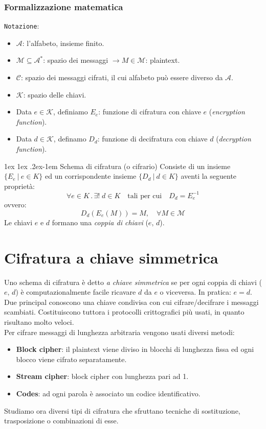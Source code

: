 \documentclass[a4paper, 11pt, notitlepage, fleqn]{report}
\makeatletter
\renewcommand{\paragraph}{%
	\@startsection{paragraph}{4}%
	{\z@}{1ex \@plus 1ex \@minus .2ex}{-1em}%
	{\normalfont\normalsize\bfseries}%
}
\makeatother
\begin{document}
\subsubsection{Formalizzazione matematica}
\texttt{Notazione}:
\begin{itemize}
	\item $\mathcal{A}$: l'alfabeto, insieme finito.
	\item $\mathcal{M}\subseteq \mathcal{A}^*$: spazio dei messaggi $\longrightarrow M\in \mathcal{M}$: plaintext.
	\item $\mathcal{C}$: spazio dei messaggi cifrati, il cui alfabeto può essere diverso da $\mathcal{A}$.
	\item $\mathcal{K}$: spazio delle chiavi.
	\item Data $e\in \mathcal{K}$, definiamo $E_e$: funzione di cifratura con chiave $e$ (\emph{encryption function}).
	\item Data $d\in \mathcal{K}$, definamo $D_d$: funzione di decifratura con chiave $d$ (\emph{decryption function}).
\end{itemize}

\paragraph{Schema di cifratura (o cifrario)}
Consiste di un insieme $\{E_e\ |\ e\in K\}$ ed un corrispondente insieme $\{D_d\ |\ d\in K\}$ aventi la seguente proprietà:
\begin{equation*}
	\forall e \in K\,.\,\exists!\;d\in K \quad\mbox{tali per cui}\quad D_d = E_e^{-1}
\end{equation*}
ovvero:
\begin{equation*}
	D_d(E_e(M)) = M, \quad \forall M\in \mathcal{M}
\end{equation*}
Le chiavi $e$ e $d$ formano una \emph{coppia di chiavi} ($e,\,d$).

\section{Cifratura a chiave simmetrica}
Uno schema di cifratura è detto \emph{a chiave simmetrica} se per ogni coppia di chiavi ($e,\,d$) è computazionalmente facile ricavare $d$ da $e$ o viceversa. In pratica: $e=d$. Due principal conoscono una chiave condivisa con cui cifrare/decifrare i messaggi scambiati. Costituiscono tuttora i protocolli crittografici più usati, in quanto risultano molto veloci.\\
Per cifrare messaggi di lunghezza arbitraria vengono usati diversi metodi:
\begin{itemize}
	\item \textbf{Block cipher}: il plaintext viene diviso in blocchi di lunghezza fissa ed ogni blocco viene cifrato separatamente.
	\item \textbf{Stream cipher}: block cipher con lunghezza pari ad 1.
	\item \textbf{Codes}: ad ogni parola è associato un codice identificativo.
\end{itemize}
Studiamo ora diversi tipi di cifratura che sfruttano tecniche di sostituzione, trasposizione o combinazioni di esse.
\end{document}
